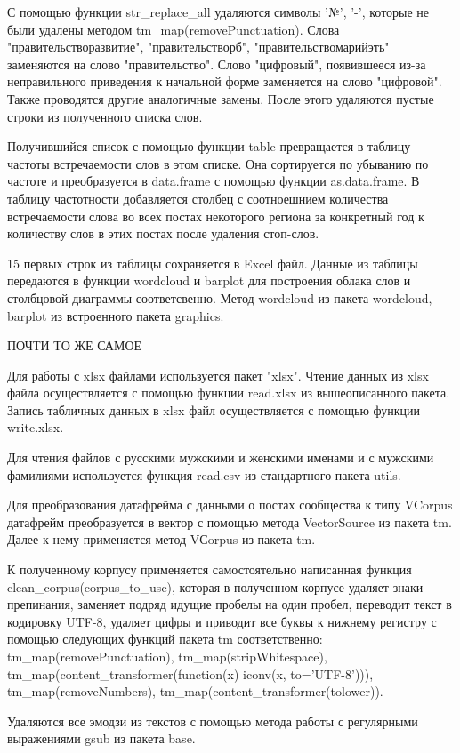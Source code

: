\documentclass[bachelor, och, coursework ]{SCWorks}
\begin{document}
С помощью функции str\_replace\_all удаляются символы '№', '-', которые не были удалены методом tm\_map(removePunctuation). Слова "правительстворазвитие", "правительстворб", "правительствомарийэть" заменяются на слово "правительство". Слово "цифровый", появившееся из-за неправильного приведения к начальной форме заменяется на слово "цифровой". Также проводятся другие аналогичные замены.
После этого удаляются пустые строки из полученного списка слов.

Получившийся список с помощью функции table 
превращается в таблицу частоты встречаемости слов в этом списке. Она сортируется по убыванию по частоте и преобразуется в data.frame с помощью функции as.data.frame. В таблицу частотности добавляется столбец с соотноешнием количества встречаемости слова во всех постах некоторого региона за конкретный год к количеству слов в этих постах после удаления стоп-слов.

15 первых строк из таблицы сохраняется в Excel файл. Данные из таблицы передаются в функции wordcloud и barplot для построения облака слов и столбцовой диаграммы соответсвенно. Метод wordcloud из пакета wordcloud, barplot из встроенного пакета graphics.

ПОЧТИ ТО ЖЕ САМОЕ


Для работы с xlsx файлами используется пакет "xlsx". Чтение данных из xlsx файла осуществляется с помощью функции read.xlsx из вышеописанного пакета. Запись табличных данных в xlsx файл осуществляется с помощью функции write.xlsx.

Для чтения файлов с русскими мужскими и женскими именами и с мужскими фамилиями используется функция read.csv из стандартного пакета utils. 

Для преобразования датафрейма с данными о постах сообщества к типу VCorpus датафрейм преобразуется в вектор с помощью метода VectorSource из пакета tm. Далее к нему применяется метод VСorpus из пакета tm.

К полученному корпусу применяется самостоятельно написанная функция clean\_corpus(corpus\_to\_use), которая в полученном корпусе удаляет знаки препинания, заменяет подряд идущие пробелы на один пробел, переводит текст в кодировку UTF-8, удаляет цифры и приводит все буквы к нижнему регистру с помощью следующих функций пакета tm соответственно: tm\_map(removePunctuation), tm\_map(stripWhitespace), tm\_map(content\_transformer(function(x) iconv(x, to='UTF-8'))), tm\_map(removeNumbers), tm\_map(content\_transformer(tolower)).

Удаляются все эмодзи из текстов с помощью метода работы с регулярными выражениями gsub из пакета base.
\end{document}
